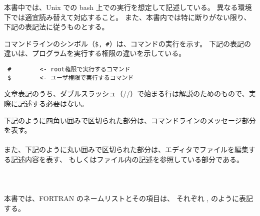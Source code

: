 
本書中では、Unix での bash 上での実行を想定して記述している。
異なる環境下では適宜読み替えて対応すること。
また、本書内では特に断りがない限り、下記の表記法に従うものとする。


コマンドラインのシンボル（\verb|$, #|）は、コマンドの実行を示す。
下記の表記の違いは、プログラムを実行する権限の違いを示している。

\begin{verbatim}
 #        <- root権限で実行するコマンド
 $        <- ユーザ権限で実行するコマンド
\end{verbatim}

文章表記のうち、ダブルスラッシュ（//）で始まる行は解説のためのもので、実際に記述する必要はない。

下記のように四角い囲みで区切られた部分は、コマンドラインのメッセージ部分を表す。\\

\\

また、下記のように丸い囲みで区切られた部分は、エディタでファイルを編集する記述内容を表す、
もしくはファイル内の記述を参照している部分である。\\

\\

~\\
~\\

本書では、FORTRAN のネームリストとその項目は、
それぞれ , のように表記する。



